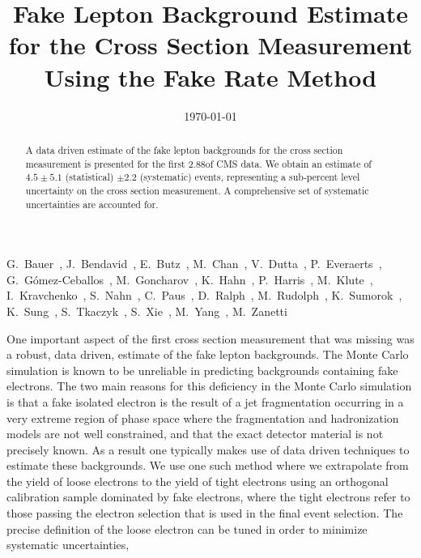 \documentclass{cmspaper}
\begin{document}
% 
%
\begin{titlepage}
\date{\today}
\title{Fake Lepton Background Estimate for the \Z\To\EE Cross Section Measurement Using the Fake Rate Method}

\begin{Authlist}
%
G.~Bauer~,
J.~Bendavid~,
E.~Butz~,
M.~Chan~,
V.~Dutta~,
P.~Everaerts~,
G.~G\'omez-Ceballos~,
M.~Goncharov~,
K.~Hahn~,
P.~Harris~,
M.~Klute~,
I.~Kravchenko~,
S.~Nahn~,
C.~Paus~,
D.~Ralph~,
M.~Rudolph~,
K.~Sumorok~,
K.~Sung~,
S.~Tkaczyk~,
S.~Xie~,
M.~Yang~,
M.~Zanetti~
%
\end{Authlist}



\begin{abstract}
A data driven estimate of the fake lepton backgrounds for the \Z\To\EE cross section measurement is presented for the first 2.88\ipb of CMS data. We obtain an estimate of $4.5 \pm 5.1$ (statistical) $\pm 2.2$ (systematic) events, representing a sub-percent level uncertainty on the cross section measurement. A comprehensive set of systematic uncertainties are accounted for.
\end{abstract}
\end{titlepage}


One important aspect of the first \Z\To\EE cross section measurement \cite{CrossSectionNote} that was missing was a robust, data driven, estimate of the fake lepton backgrounds. The Monte Carlo simulation is known to be unreliable in predicting backgrounds containing fake electrons. The two main reasons for this deficiency in the Monte Carlo simulation is that a fake isolated electron is the result of a jet fragmentation occurring in a very extreme region of phase space where the fragmentation and hadronization models are not well constrained, and that the exact detector material is not precisely known. As a result one typically makes use of data driven techniques to estimate these backgrounds. We use one such method where we extrapolate from the yield of loose electrons to the yield of tight electrons using an orthogonal calibration sample dominated by fake electrons, where the tight electrons refer to those passing the electron selection that is used in the final event selection. The precise definition of the loose electron can be tuned in order to minimize systematic uncertainties, 
\end{document}
